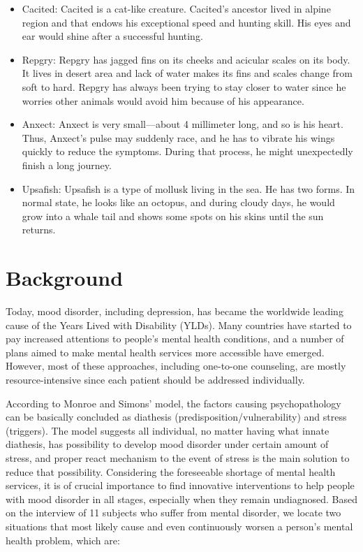 \documentclass[manuscript,screen]{acmart}
\begin{document}
\begin{itemize}
  \item Cacited: Cacited is a cat-like creature. Cacited’s ancestor lived in alpine region and that endows his exceptional speed and hunting skill. His eyes and ear would shine after a successful hunting.
  \item Repgry: Repgry has jagged fins on its cheeks and acicular scales on its body. It lives in desert area and lack of water makes its fins and scales change from soft to hard. Repgry has always been trying to stay closer to water since he worries other animals would avoid him because of his appearance.
  \item Anxect: Anxect is very small—about 4 millimeter long, and so is his heart. Thus, Anxect’s pulse may suddenly race, and he has to vibrate his wings quickly to reduce the symptoms. During that process, he might unexpectedly finish a long journey. 
  \item Upsafish: Upsafish is a type of mollusk living in the sea. He has two forms. In normal state, he looks like an octopus, and during cloudy days, he would grow into a whale tail  and shows some spots on his skins until the sun returns.
\end{itemize}


\section{Background}

Today, mood disorder, including depression, has became the worldwide leading cause of the Years Lived with Disability (YLDs). Many countries have started to pay increased attentions to people’s mental health conditions, and a number of plans aimed to make mental health services more accessible have emerged. However, most of these approaches, including one-to-one counseling, are mostly resource-intensive since each patient should be addressed individually.\cite{world2019special}

According to Monroe and Simons' model, the factors causing psychopathology can be basically concluded as diathesis (predisposition/vulnerability) and stress (triggers).\cite{monroe1991diathesis}
The model suggests all individual, no matter having what innate diathesis, has possibility to develop mood disorder under certain amount of stress, and proper react mechanism to the event of stress is the main solution to reduce that possibility. Considering the foreseeable shortage of mental health services, it is of crucial importance to find innovative interventions to help people with mood disorder in all stages, especially when they remain undiagnosed. Based on the interview of 11 subjects who suffer from mental disorder, we locate two situations that most likely cause and even continuously worsen a person’s mental health problem, which are:
\end{document}
